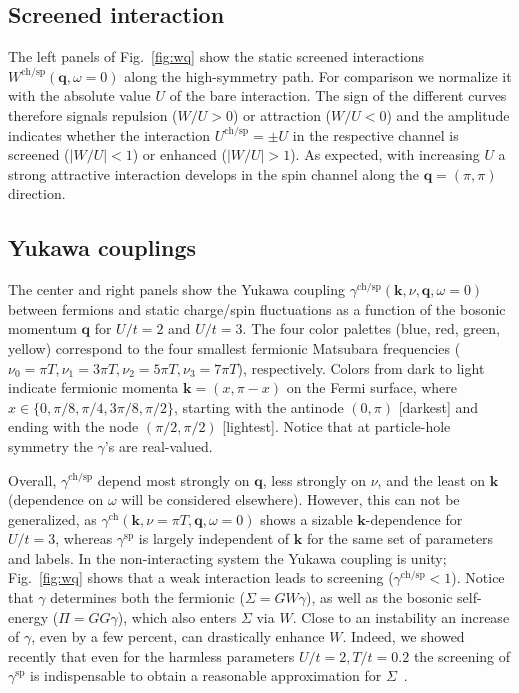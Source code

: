 \documentclass[epj]{svjour}
\newcommand{\kv}{\ensuremath{\mathbf{k}}}
\newcommand{\qv}{\ensuremath{\mathbf{q}}}
\newcommand{\ch}{\ensuremath{\text{ch}}}
\newcommand{\sz}{\ensuremath{\text{sp}}}
\begin{document}
\subsection{Screened interaction}\label{sec:w}
The left panels of Fig.~\ref{fig:wq} show the static screened interactions $W^{\ch/\sz}(\qv,\omega=0)$
along the high-symmetry path. For comparison we normalize it with the absolute value $U$ of the bare interaction.
The sign of the different curves therefore signals repulsion ($W/U>0$) or attraction ($W/U<0$)
and the amplitude indicates whether the interaction $U^{\ch/\sz}=\pm U$ in the respective
channel is screened ($|W/U|<1$) or enhanced ($|W/U|>1$).
As expected, with increasing $U$ a strong attractive interaction develops
in the spin channel along the $\qv=(\pi,\pi)$ direction.

\subsection{Yukawa couplings}\label{sec:gamma}
The center and right panels show the Yukawa coupling $\gamma^{\ch/\sz}(\kv,\nu,\qv,\omega=0)$
between fermions and static charge/spin fluctuations as a function of the bosonic momentum $\qv$ for $U/t=2$ and $U/t=3$.
The four color palettes (blue, red, green, yellow) correspond to the four smallest fermionic Matsubara frequencies
($\nu_0=\pi T, \nu_1=3\pi T, \nu_2=5\pi T, \nu_3=7\pi T$), respectively.
Colors from dark to light indicate fermionic momenta $\kv=(x,\pi-x)$ on the Fermi surface,
where $x\in\{0,\pi/8,\pi/4,3\pi/8,\pi/2\}$,
starting with the antinode $(0,\pi)$ [darkest] and ending with the node $(\pi/2,\pi/2)$ [lightest].
Notice that at particle-hole symmetry the $\gamma$'s are real-valued.

Overall, $\gamma^{\ch/\sz}$ depend most strongly on $\qv$, less strongly on $\nu$,
and the least on $\kv$ (dependence on $\omega$ will be considered elsewhere).
However, this can not be generalized, as $\gamma^{\ch}(\kv,\nu=\pi T,\qv,\omega=0)$
shows a sizable $\kv$-dependence for $U/t=3$, 
whereas $\gamma^{\sz}$ is largely independent of $\kv$ for the same set of parameters and labels.
In the non-interacting system the Yukawa coupling is unity;
Fig.~\ref{fig:wq} shows that a weak interaction leads to screening ($\gamma^{\ch/\sz}<1$).
Notice that $\gamma$ determines both the fermionic ($\Sigma=GW\gamma$),
as well as the bosonic self-energy ($\Pi=GG\gamma$), which also enters $\Sigma$ via $W$.
Close to an instability an increase of $\gamma$, even by a few percent, can drastically enhance $W$.
Indeed, we showed recently that even for the harmless parameters $U/t=2, T/t=0.2$
the screening of $\gamma^\sz$ is indispensable to obtain a reasonable approximation for $\Sigma$~\cite{Krien21-2}.
\end{document}
